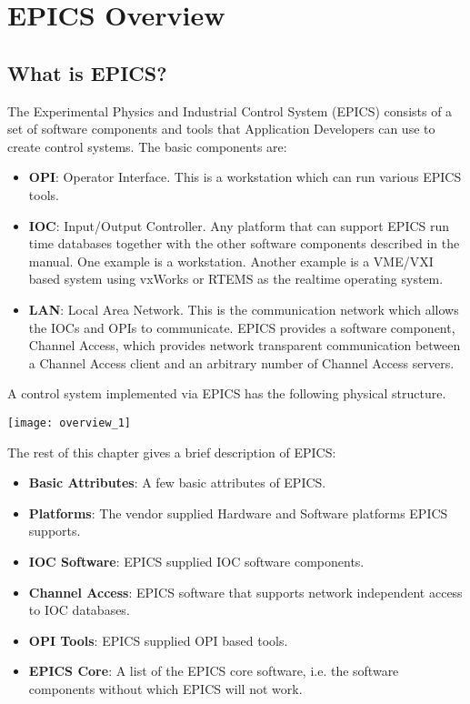 \chapter{EPICS Overview}

\section{What is EPICS?}

The Experimental Physics and Industrial Control System (EPICS) consists of a set of software components and tools that
Application Developers can use to create control systems. The basic components are:

\begin{itemize}
\item \textbf{OPI}: Operator Interface. This is a workstation which can run various EPICS tools.

\item \textbf{IOC}: Input/Output Controller. Any platform that can support EPICS run time databases together with the other 
software components described in the manual. One example is a workstation. Another example is a VME/VXI 
based system using vxWorks or RTEMS as the realtime operating system.

\item \textbf{LAN}: Local Area Network. This is the communication network which allows the IOCs and OPIs to communicate. 
EPICS provides a software component, Channel Access, which provides network transparent communication 
between a Channel Access client and an arbitrary number of Channel Access servers.
\end{itemize}

A control system implemented via EPICS has the following physical structure.

\begin{center}
\texttt{[image: overview\_1]}
\end{center}

The rest of this chapter gives a brief description of EPICS:

\begin{itemize}
\item \textbf{Basic Attributes}: A few basic attributes of EPICS.
\item \textbf{Platforms}: The vendor supplied Hardware and Software platforms EPICS supports.
\item \textbf{IOC Software}: EPICS supplied IOC software components.
\item \textbf{Channel Access}:  EPICS software that supports network independent access to IOC databases.
\item \textbf{OPI Tools}: EPICS supplied OPI based tools.
\item \textbf{EPICS Core}: A list of the EPICS core software, i.e. the software components without which EPICS will not work.
\end{itemize}

